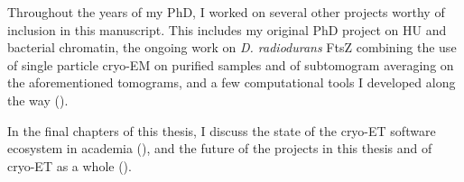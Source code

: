 Throughout the years of my PhD, I worked on several other projects worthy of inclusion in this manuscript.
This includes my original PhD project on HU and bacterial chromatin, the ongoing work on \textit{D. radiodurans} FtsZ combining the use of single particle cryo-EM on purified samples and of subtomogram averaging on the aforementioned tomograms, and a few computational tools I developed along the way ().

In the final chapters of this thesis, I discuss the state of the cryo-ET software ecosystem in academia (), and the future of the projects in this thesis and of cryo-ET as a whole ().
